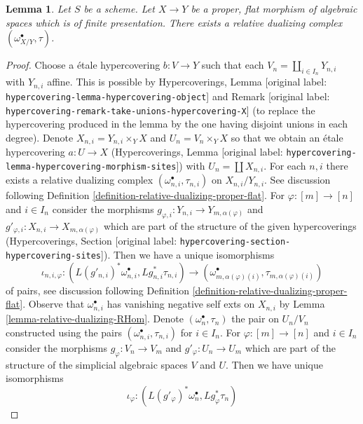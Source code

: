 \documentclass[10pt,a4paper]{article}
\theoremstyle{plain}
\newtheorem{lemma}[subsection]{Lemma}
\theoremstyle{definition}
\theoremstyle{remark}
\numberwithin{equation}{subsection}
\begin{document}
\begin{lemma}
\label{lemma-existence-relative-dualizing}
Let $S$ be a scheme. Let $X \to Y$ be a proper, flat morphism of
algebraic spaces which is of finite presentation.
There exists a relative dualizing complex $(\omega_{X/Y}^\bullet, \tau)$.
\end{lemma}



\begin{proof}
Choose a \'etale hypercovering $b : V \to Y$ such that each
$V_n = \coprod_{i \in I_n} Y_{n, i}$ with $Y_{n, i}$ affine.
This is possible by Hypercoverings, Lemma
\textnormal{[original label: \nolinkurl{hypercovering-lemma-hypercovering-object}]} and
Remark \textnormal{[original label: \nolinkurl{hypercovering-remark-take-unions-hypercovering-X}]}
(to replace the hypercovering produced
in the lemma by the one having disjoint unions in each degree).
Denote $X_{n, i} = Y_{n, i} \times_Y X$ and $U_n = V_n \times_Y X$
so that we obtain an \'etale hypercovering
$a : U \to X$ (Hypercoverings, Lemma
\textnormal{[original label: \nolinkurl{hypercovering-lemma-hypercovering-morphism-sites}]})
with $U_n = \coprod X_{n, i}$.
For each $n, i$ there exists a relative dualizing complex
$(\omega_{n, i}^\bullet, \tau_{n, i})$ on $X_{n, i}/Y_{n, i}$.
See discussion following
Definition \ref{definition-relative-dualizing-proper-flat}.
For $\varphi : [m] \to [n]$ and $i \in I_n$ consider the morphisms
$g_{\varphi, i} : Y_{n, i} \to Y_{m, \alpha(\varphi)}$ and
$g'_{\varphi, i} : X_{n, i} \to X_{m, \alpha(\varphi)}$
which are part of the structure of the given hypercoverings
(Hypercoverings, Section \textnormal{[original label: \nolinkurl{hypercovering-section-hypercovering-sites}]}).
Then we have a unique isomorphisms
$$
\iota_{n, i, \varphi} :
(L(g'_{n, i})^*\omega_{n, i}^\bullet, Lg_{n, i}^*\tau_{n, i})
\longrightarrow
(\omega_{m, \alpha(\varphi)(i)}^\bullet, \tau_{m, \alpha(\varphi)(i)})
$$
of pairs, see discussion following
Definition \ref{definition-relative-dualizing-proper-flat}.
Observe that $\omega_{n, i}^\bullet$ has vanishing negative
self exts on $X_{n, i}$ by Lemma \ref{lemma-relative-dualizing-RHom}.
Denote $(\omega_n^\bullet, \tau_n)$ the pair on $U_n/V_n$ constructed using
the pairs $(\omega_{n, i}^\bullet, \tau_{n, i})$ for $i \in I_n$.
For $\varphi : [m] \to [n]$ and $i \in I_n$ consider the morphisms
$g_\varphi : V_n \to V_m$ and $g'_\varphi : U_n \to U_m$ which are part
of the structure of the simplicial algebraic spaces $V$ and $U$.
Then we have unique isomorphisms
$$
\iota_\varphi :
(L(g'_\varphi)^*\omega_n^\bullet, Lg_\varphi^*\tau_n)
$$
\end{proof}
\end{document}
